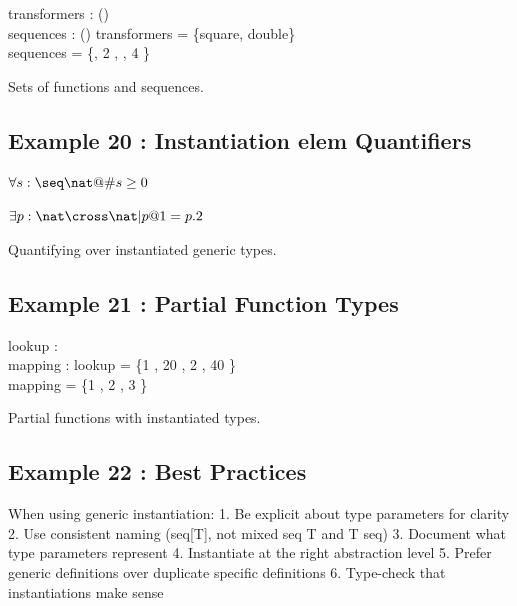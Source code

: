 \documentclass[a4paper,10pt,fleqn]{article}
\begin{document}
\begin{axdef}
transformers : \power (\nat \fun \nat) \\
sequences : \power (\seq \nat)
\where
transformers = \{square, double\} \\
sequences = \{, 2 \rangle, , 4 \rangle\}
\end{axdef}

\noindent Sets of functions and sequences.

\bigskip

\subsection*{Example 20 : Instantiation elem Quantifiers}

\noindent
$\forall s : \seq \nat @ \# s \geq 0$


\noindent
$\exists p : \nat \cross \nat | p @ 1 = p.2$


\noindent Quantifying over instantiated generic types.

\bigskip

\subsection*{Example 21 : Partial Function Types}

\begin{axdef}
lookup : \nat \pfun \seq \nat \\
mapping : \nat \rel \nat
\where
lookup = \{1 \mapsto {}, 20 \rangle, 2 \mapsto {}, 40 \rangle\} \\
mapping = \{1 , 2 , 3 \}
\end{axdef}

\noindent Partial functions with instantiated types.

\bigskip

\subsection*{Example 22 : Best Practices}

\noindent When using generic instantiation: 1. Be explicit about type parameters for clarity 2. Use consistent naming (seq[T], not mixed seq T and T seq) 3. Document what type parameters represent 4. Instantiate at the right abstraction level 5. Prefer generic definitions over duplicate specific definitions 6. Type-check that instantiations make sense
\end{document}
